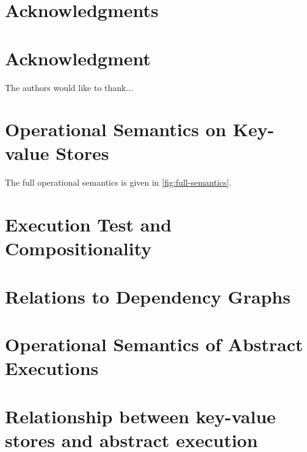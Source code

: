 \documentclass[conference,compsoc]{IEEEtran}
\newcommand{\RootPath}{.}
\begin{document}
  \section*{Acknowledgments}
\else
  \section*{Acknowledgment}
\fi
The authors would like to thank...

  


\newpage
\onecolumn
\appendices

\section{Operational Semantics on Key-value Stores}
\label{sec:full-semantics}

The full operational semantics is given in \cref{fig:full-semantics}.

\section{Execution Test and Compositionality}
\label{app:compositionality}






\section{Relations to Dependency Graphs}
\label{app:depgraphs}
\label{sec:dependent-graph}

\section{Operational Semantics of Abstract Executions}


\section{Relationship between key-value stores and abstract execution}




\end{document}
